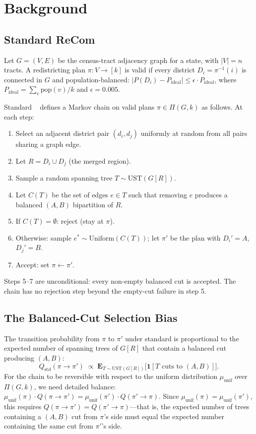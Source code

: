\section{Background}
\label{sec:background}

\subsection{Standard ReCom}

Let $G = (V, E)$ be the census-tract adjacency graph for a state, with
$|V| = n$ tracts.
A redistricting plan $\pi : V \to [k]$ is valid if every district
$D_i = \pi^{-1}(i)$ is connected in $G$ and population-balanced:
$|P(D_i) - P_{\mathrm{ideal}}| \leq \epsilon \cdot P_{\mathrm{ideal}}$,
where $P_{\mathrm{ideal}} = \sum_{v} \mathrm{pop}(v) / k$ and
$\epsilon = 0.005$.

Standard \recom{}~\citep{deford2021} defines a Markov chain on valid plans
$\pi \in \Pi(G, k)$ as follows.
At each step:
\begin{enumerate}
  \item Select an adjacent district pair $(d_i, d_j)$ uniformly at random
        from all pairs sharing a graph edge.
  \item Let $R = D_i \cup D_j$ (the merged region).
  \item Sample a random spanning tree $T \sim \mathrm{UST}(G[R])$.
  \item Let $C(T)$ be the set of edges $e \in T$ such that removing $e$
        produces a balanced $(A, B)$ bipartition of $R$.
  \item If $C(T) = \emptyset$: reject (stay at $\pi$).
  \item Otherwise: sample $e^* \sim \mathrm{Uniform}(C(T))$; let $\pi'$
        be the plan with $D_i' = A$, $D_j' = B$.
  \item Accept: set $\pi \gets \pi'$.
\end{enumerate}
Steps 5--7 are unconditional: every non-empty balanced cut is accepted.
The chain has no rejection step beyond the empty-cut failure in step 5.

\subsection{The Balanced-Cut Selection Bias}

The transition probability from $\pi$ to $\pi'$ under standard \recom{}
is proportional to the expected number of spanning trees of $G[R]$ that
contain a balanced cut producing $(A, B)$:
\[
  Q_{\mathrm{std}}(\pi \to \pi') \;\propto\;
  \mathbf{E}_{T \sim \mathrm{UST}(G[R])}\bigl[\mathbf{1}[T \text{ cuts to } (A,B)]\bigr].
\]
For the chain to be reversible with respect to the uniform distribution
$\mu_{\mathrm{unif}}$ over $\Pi(G, k)$, we need detailed balance:
$\mu_{\mathrm{unif}}(\pi) \cdot Q(\pi \to \pi') = \mu_{\mathrm{unif}}(\pi') \cdot Q(\pi' \to \pi)$.
Since $\mu_{\mathrm{unif}}(\pi) = \mu_{\mathrm{unif}}(\pi')$, this requires
$Q(\pi \to \pi') = Q(\pi' \to \pi)$---that is, the expected number of trees
containing a $(A,B)$ cut from $\pi$'s side must equal the expected number
containing the same cut from $\pi'$'s side.

